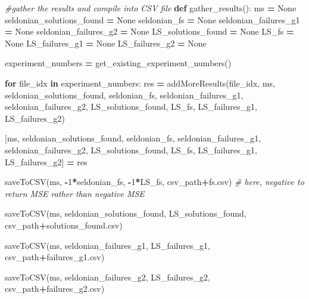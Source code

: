 \documentclass[12pt, twoside]{amherstthesis}
\newenvironment{Shaded}{\begin{snugshade}}{\end{snugshade}}
\newcommand{\CommentTok}[1]{\textcolor[rgb]{0.56,0.35,0.01}{\textit{#1}}}
\newcommand{\ControlFlowTok}[1]{\textcolor[rgb]{0.13,0.29,0.53}{\textbf{#1}}}
\newcommand{\DecValTok}[1]{\textcolor[rgb]{0.00,0.00,0.81}{#1}}
\newcommand{\KeywordTok}[1]{\textcolor[rgb]{0.13,0.29,0.53}{\textbf{#1}}}
\newcommand{\NormalTok}[1]{#1}
\newcommand{\OperatorTok}[1]{\textcolor[rgb]{0.81,0.36,0.00}{\textbf{#1}}}
\newcommand{\StringTok}[1]{\textcolor[rgb]{0.31,0.60,0.02}{#1}}
\newcommand{\VariableTok}[1]{\textcolor[rgb]{0.00,0.00,0.00}{#1}}
\begin{document}
\begin{Shaded}
\begin{Highlighting}[]
\CommentTok{\#gather the results and compile into CSV file}
\KeywordTok{def}\NormalTok{ gather\_results():}
\NormalTok{    ms                        }\OperatorTok{=} \VariableTok{None}
\NormalTok{    seldonian\_solutions\_found }\OperatorTok{=} \VariableTok{None}
\NormalTok{    seldonian\_fs              }\OperatorTok{=} \VariableTok{None}
\NormalTok{    seldonian\_failures\_g1     }\OperatorTok{=} \VariableTok{None}
\NormalTok{    seldonian\_failures\_g2     }\OperatorTok{=} \VariableTok{None}
\NormalTok{    LS\_solutions\_found        }\OperatorTok{=} \VariableTok{None}
\NormalTok{    LS\_fs                     }\OperatorTok{=} \VariableTok{None}
\NormalTok{    LS\_failures\_g1            }\OperatorTok{=} \VariableTok{None}
\NormalTok{    LS\_failures\_g2            }\OperatorTok{=} \VariableTok{None}

\NormalTok{    experiment\_numbers }\OperatorTok{=}\NormalTok{ get\_existing\_experiment\_numbers()}

    \ControlFlowTok{for}\NormalTok{ file\_idx }\KeywordTok{in}\NormalTok{ experiment\_numbers:}
\NormalTok{        res }\OperatorTok{=}\NormalTok{ addMoreResults(file\_idx, }
\NormalTok{            ms, }
\NormalTok{            seldonian\_solutions\_found, }
\NormalTok{            seldonian\_fs, seldonian\_failures\_g1, seldonian\_failures\_g2, }
\NormalTok{            LS\_solutions\_found, LS\_fs, LS\_failures\_g1, LS\_failures\_g2)}
        
\NormalTok{        [ms, }
\NormalTok{        seldonian\_solutions\_found, seldonian\_fs, seldonian\_failures\_g1,}
\NormalTok{        seldonian\_failures\_g2, LS\_solutions\_found, LS\_fs, LS\_failures\_g1, }
\NormalTok{        LS\_failures\_g2] }\OperatorTok{=}\NormalTok{ res}

\NormalTok{    saveToCSV(ms,  }
    \OperatorTok{{-}}\DecValTok{1}\OperatorTok{*}\NormalTok{seldonian\_fs,           }
    \OperatorTok{{-}}\DecValTok{1}\OperatorTok{*}\NormalTok{LS\_fs,           }
\NormalTok{    csv\_path}\OperatorTok{+}\StringTok{\textquotesingle{}fs.csv\textquotesingle{}}\NormalTok{) }\CommentTok{\# here, negative to return MSE rather than negative MSE}
    
\NormalTok{    saveToCSV(ms,  }
\NormalTok{    seldonian\_solutions\_found,  }
\NormalTok{    LS\_solutions\_found, }
\NormalTok{    csv\_path}\OperatorTok{+}\StringTok{\textquotesingle{}solutions\_found.csv\textquotesingle{}}\NormalTok{)}
    
\NormalTok{    saveToCSV(ms,  }
\NormalTok{    seldonian\_failures\_g1,      }
\NormalTok{    LS\_failures\_g1,     }
\NormalTok{    csv\_path}\OperatorTok{+}\StringTok{\textquotesingle{}failures\_g1.csv\textquotesingle{}}\NormalTok{)}
    
\NormalTok{    saveToCSV(ms,  }
\NormalTok{    seldonian\_failures\_g2,      }
\NormalTok{    LS\_failures\_g2,     }
\NormalTok{    csv\_path}\OperatorTok{+}\StringTok{\textquotesingle{}failures\_g2.csv\textquotesingle{}}\NormalTok{)}
\end{Highlighting}
\end{Shaded}
\end{document}
